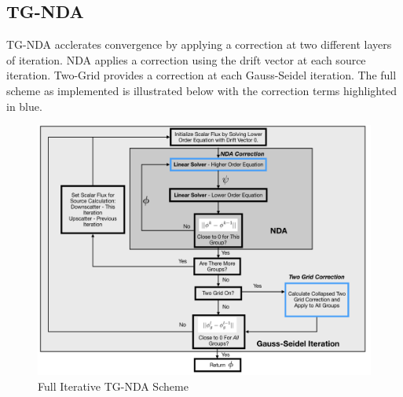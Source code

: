 \subsection{TG-NDA}
TG-NDA acclerates convergence by applying a correction at two different layers of iteration. NDA applies a correction using the drift vector at each source iteration. Two-Grid provides a correction at each Gauss-Seidel iteration. The full scheme as implemented is illustrated below with the correction terms highlighted in blue. 


\begin{figure}[H]
    \centering
    \includegraphics[width=\textwidth]{fig/TGNDAchart.png}
    \caption{Full Iterative TG-NDA Scheme}
    \label{fig:tgnda-graph}
\end{figure}